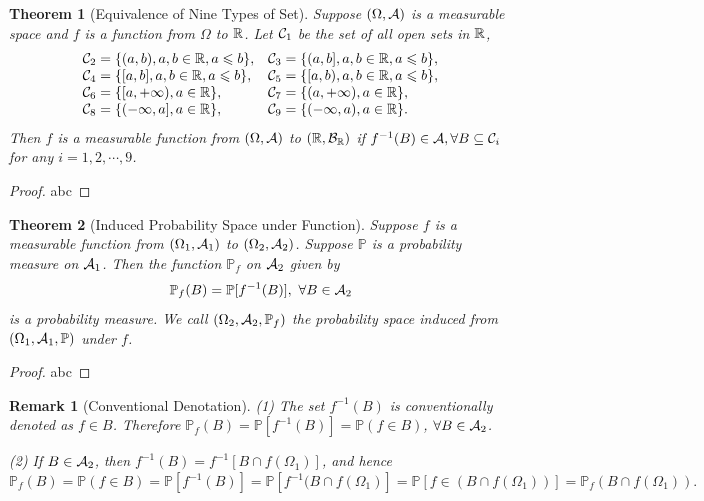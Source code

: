 \documentclass[openany,12pt]{book}
\newtheorem{theorem}{Theorem}[chapter]
\newtheorem{remark}{Remark}[chapter]
\begin{document}
\begin{theorem}[Equivalence of Nine Types of Set]
  Suppose $(\Omega,\mathcal{A})$ is a measurable space and $f$ is a function from $\Omega$ to $\mathbb{R}$. Let $\mathcal{C}_1$ be the set of all open sets in $\mathbb{R}$,
  $$
    \begin{array}{ll}
      \mathcal{C}_2=\{(a,b),a,b\in\mathbb{R},a\leqslant b\}, & \mathcal{C}_3=\{(a,b],a,b\in\mathbb{R},a\leqslant b\}, \\
      \mathcal{C}_4=\{[a,b],a,b\in\mathbb{R},a\leqslant b\}, & \mathcal{C}_5=\{[a,b),a,b\in\mathbb{R},a\leqslant b\}, \\
      \mathcal{C}_6=\{[a,+\infty),a\in\mathbb{R}\},    & \mathcal{C}_7=\{(a,+\infty),a\in\mathbb{R}\},    \\
      \mathcal{C}_8=\{(-\infty,a],a\in\mathbb{R}\},    & \mathcal{C}_9=\{(-\infty,a),a\in\mathbb{R}\}.    \\
    \end{array}
  $$
  Then $f$ is a measurable function from $(\Omega,\mathcal{A})$ to $(\mathbb{R},\mathcal{B}_{\mathbb{R}})$
  if $f^{-1} (B)\in\mathcal{A}, \forall B\subseteq\mathcal{C}_i$ for any $i=1,2, \cdots,9$.
\end{theorem}

\begin{proof}
  abc
\end{proof}

\begin{theorem}[Induced Probability Space under Function]
  Suppose $f$ is a measurable function from $(\Omega_1,\mathcal{A}_1)$ to $(\Omega_2,\mathcal{A}_2)$. Suppose $\mathbb{P}$ is a probability measure on $\mathcal{A}_1$.
  Then the function $\mathbb{P}_f$ on $\mathcal{A}_2$ given by $$\mathbb{P}_f(B)=\mathbb{P}[f^{-1} (B)],~\forall B\in\mathcal{A}_2$$ is a probability measure. We call $(\Omega_2,\mathcal{A}_2,\mathbb{P}_f)$ the probability space induced from $(\Omega_1,\mathcal{A}_1,\mathbb{P})$ under $f$.
\end{theorem}

\begin{proof}
  abc
\end{proof}

\begin{remark}[Conventional Denotation]
  (1) The set $f^{-1} (B)$ is conventionally denoted as $f\in B$. Therefore $\mathbb{P}_f (B)=\mathbb{P}[f^{-1}(B)]=\mathbb{P}(f\in B)$, $\forall B\in\mathcal{A}_2$.

  (2) If $B\in\mathcal{A}_2$, then $f^{-1}(B)=f^{-1}[B\cap f(\Omega_1)]$, and hence $\mathbb{P}_f(B)=\mathbb{P}(f\in B)=\mathbb{P}[f^{-1}(B)]=\mathbb{P}[f^{-1} (B\cap f(\Omega_1)]=\mathbb{P}[f\in (B\cap f(\Omega_1))]=\mathbb{P}_f(B\cap f(\Omega_1)).$
\end{remark}
\end{document}
